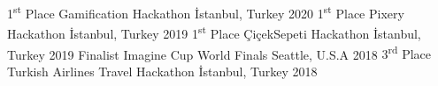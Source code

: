 
\vspace*{-1.5mm}

\begin{cvhonors}
  \cvhonor
    {1\textsuperscript{st} Place}
    {Gamification Hackathon}
    {İstanbul, Turkey}
    {2020}
  \cvhonor
   {1\textsuperscript{st} Place}
   {Pixery Hackathon}
   {İstanbul, Turkey}
   {2019}
  \cvhonor
    {1\textsuperscript{st} Place}
    {ÇiçekSepeti Hackathon}
    {İstanbul, Turkey}
    {2019}
  \cvhonor
    {Finalist}%
    {Imagine Cup World Finals}%
    {Seattle, U.S.A}%
    {2018}%
  \cvhonor
    {3\textsuperscript{rd} Place}
    {Turkish Airlines Travel Hackathon}
    {İstanbul, Turkey}
    {2018}

\end{cvhonors}
